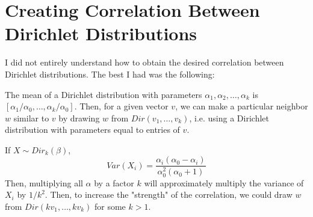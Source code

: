 \documentclass{article}
\begin{document}
\section{Creating Correlation Between Dirichlet Distributions}
I did not entirely understand how to obtain the desired correlation between Dirichlet distributions. The best I had was the following:

The mean of a Dirichlet distribution with parameters $\alpha_1, \alpha_2,\ldots,\alpha_k$ is $[\alpha_1/\alpha_0, \ldots,\alpha_k/\alpha_0]$. Then, for a given vector $v$, we can make a particular neighbor $w$ similar to $v$ by drawing $w$ from $Dir(v_1, \ldots, v_k)$, i.e. using a Dirichlet distribution with parameters equal to entries of $v$.

If $X\sim Dir_k(\beta)$,
$$Var(X_i) = \frac{\alpha_i(\alpha_0 - \alpha_i)}{\alpha_0^2(\alpha_0 + 1)}$$
Then, multiplying all $\alpha$ by a factor $k$ will approximately multiply the variance of $X_i$ by $1/k^2$. Then, to increase the "strength" of the correlation, we could draw $w$ from $Dir(kv_1, \ldots, kv_k)$ for some $k > 1$.
\end{document}

